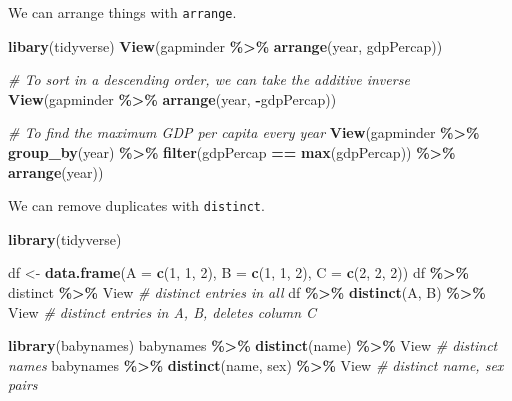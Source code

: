 \documentclass[
]{article}
\newenvironment{Shaded}{\begin{snugshade}}{\end{snugshade}}
\newcommand{\AttributeTok}[1]{\textcolor[rgb]{0.13,0.29,0.53}{#1}}
\newcommand{\CommentTok}[1]{\textcolor[rgb]{0.56,0.35,0.01}{\textit{#1}}}
\newcommand{\DecValTok}[1]{\textcolor[rgb]{0.00,0.00,0.81}{#1}}
\newcommand{\FunctionTok}[1]{\textcolor[rgb]{0.13,0.29,0.53}{\textbf{#1}}}
\newcommand{\NormalTok}[1]{#1}
\newcommand{\OtherTok}[1]{\textcolor[rgb]{0.56,0.35,0.01}{#1}}
\newcommand{\SpecialCharTok}[1]{\textcolor[rgb]{0.81,0.36,0.00}{\textbf{#1}}}
\begin{document}
We can arrange things with \texttt{arrange}.

\begin{Shaded}
\begin{Highlighting}[]
\FunctionTok{libary}\NormalTok{(tidyverse)}
\FunctionTok{View}\NormalTok{(gapminder }\SpecialCharTok{\%\textgreater{}\%} \FunctionTok{arrange}\NormalTok{(year, gdpPercap))}

\CommentTok{\# To sort in a descending order, we can take the additive inverse}
\FunctionTok{View}\NormalTok{(gapminder }\SpecialCharTok{\%\textgreater{}\%} \FunctionTok{arrange}\NormalTok{(year, }\SpecialCharTok{{-}}\NormalTok{gdpPercap))}

\CommentTok{\# To find the maximum GDP per capita every year}
\FunctionTok{View}\NormalTok{(gapminder }\SpecialCharTok{\%\textgreater{}\%} \FunctionTok{group\_by}\NormalTok{(year) }\SpecialCharTok{\%\textgreater{}\%} \FunctionTok{filter}\NormalTok{(gdpPercap }\SpecialCharTok{==} \FunctionTok{max}\NormalTok{(gdpPercap))}
     \SpecialCharTok{\%\textgreater{}\%} \FunctionTok{arrange}\NormalTok{(year))}
\end{Highlighting}
\end{Shaded}

We can remove duplicates with \texttt{distinct}.

\begin{Shaded}
\begin{Highlighting}[]
\FunctionTok{library}\NormalTok{(tidyverse)}
\end{Highlighting}
\end{Shaded}

\begin{Shaded}
\begin{Highlighting}[]
\NormalTok{df }\OtherTok{\textless{}{-}} \FunctionTok{data.frame}\NormalTok{(}\AttributeTok{A =} \FunctionTok{c}\NormalTok{(}\DecValTok{1}\NormalTok{, }\DecValTok{1}\NormalTok{, }\DecValTok{2}\NormalTok{),}
                 \AttributeTok{B =} \FunctionTok{c}\NormalTok{(}\DecValTok{1}\NormalTok{, }\DecValTok{1}\NormalTok{, }\DecValTok{2}\NormalTok{),}
                 \AttributeTok{C =} \FunctionTok{c}\NormalTok{(}\DecValTok{2}\NormalTok{, }\DecValTok{2}\NormalTok{, }\DecValTok{2}\NormalTok{))}
\NormalTok{df }\SpecialCharTok{\%\textgreater{}\%}\NormalTok{ distinct }\SpecialCharTok{\%\textgreater{}\%}\NormalTok{ View }\CommentTok{\# distinct entries in all}
\NormalTok{df }\SpecialCharTok{\%\textgreater{}\%} \FunctionTok{distinct}\NormalTok{(A, B) }\SpecialCharTok{\%\textgreater{}\%}\NormalTok{ View }\CommentTok{\# distinct entries in A, B, deletes column C}

\FunctionTok{library}\NormalTok{(babynames)}
\NormalTok{babynames }\SpecialCharTok{\%\textgreater{}\%} \FunctionTok{distinct}\NormalTok{(name) }\SpecialCharTok{\%\textgreater{}\%}\NormalTok{ View }\CommentTok{\# distinct names}
\NormalTok{babynames }\SpecialCharTok{\%\textgreater{}\%} \FunctionTok{distinct}\NormalTok{(name, sex) }\SpecialCharTok{\%\textgreater{}\%}\NormalTok{ View }\CommentTok{\# distinct name, sex pairs}
\end{Highlighting}
\end{Shaded}
\end{document}
